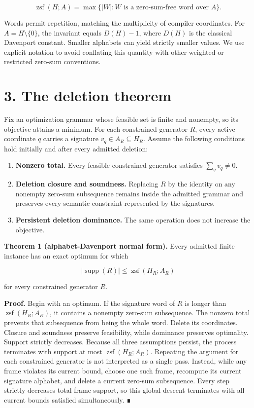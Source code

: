 \documentclass[
  11pt,
]{article}
\providecommand{\tightlist}{%
  \setlength{\itemsep}{0pt}\setlength{\parskip}{0pt}}
\begin{document}
\[
\operatorname{zsf}(H; A)
=\max\{|W|:W\text{ is a zero-sum-free word over }A\}.
\]

Words permit repetition, matching the multiplicity of compiler
coordinates. For \(A=H\setminus\{0\}\), the invariant equals \(D(H)-1\),
where \(D(H)\) is the classical Davenport constant. Smaller alphabets
can yield strictly smaller values. We use explicit notation to avoid
conflating this quantity with other weighted or restricted zero-sum
conventions.

\hypertarget{the-deletion-theorem}{%
\section{3. The deletion theorem}\label{the-deletion-theorem}}

Fix an optimization grammar whose feasible set is finite and nonempty,
so its objective attains a minimum. For each constrained generator
\(R\), every active coordinate \(q\) carries a signature
\(v_q\in A_R\subseteq H_R\). Assume the following conditions hold
initially and after every admitted deletion:

\begin{enumerate}
\def\labelenumi{\arabic{enumi}.}
\tightlist
\item
  \textbf{Nonzero total.} Every feasible constrained generator satisfies
  \(\sum_q v_q\ne0\).
\item
  \textbf{Deletion closure and soundness.} Replacing \(R\) by the
  identity on any nonempty zero-sum subsequence remains inside the
  admitted grammar and preserves every semantic constraint represented
  by the signatures.
\item
  \textbf{Persistent deletion dominance.} The same operation does not
  increase the objective.
\end{enumerate}

\textbf{Theorem 1 (alphabet-Davenport normal form).} Every admitted
finite instance has an exact optimum for which

\[
|\operatorname{supp}(R)|\le \operatorname{zsf}(H_R; A_R)
\]

for every constrained generator \(R\).

\textbf{Proof.} Begin with an optimum. If the signature word of \(R\) is
longer than \(\operatorname{zsf}(H_R; A_R)\), it contains a nonempty
zero-sum subsequence. The nonzero total prevents that subsequence from
being the whole word. Delete its coordinates. Closure and soundness
preserve feasibility, while dominance preserves optimality. Support
strictly decreases. Because all three assumptions persist, the process
terminates with support at most \(\operatorname{zsf}(H_R; A_R)\).
Repeating the argument for each constrained generator is not interpreted
as a single pass. Instead, while any frame violates its current bound,
choose one such frame, recompute its current signature alphabet, and
delete a current zero-sum subsequence. Every step strictly decreases
total frame support, so this global descent terminates with all current
bounds satisfied simultaneously. ∎
\end{document}
